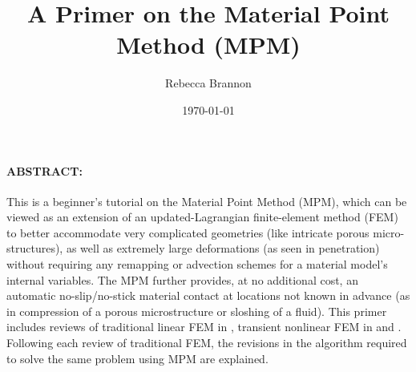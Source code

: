 
\title{A Primer on the Material Point Method (MPM)}
\author{Rebecca Brannon}
\date{\mydate\today}
\begin{minipage}[h]{\textwidth}
    \maketitle
\end{minipage}
\vspace{1cm}

\begin{MyAbstract}
\paragraph{ABSTRACT:}
This \manuscript is a beginner's tutorial on the Material Point Method (MPM), which can be viewed as an extension of an updated-Lagrangian finite-element method (FEM) to better accommodate very complicated geometries (like intricate porous micro-structures), as well as extremely large deformations (as seen in penetration) without requiring any remapping or advection schemes for a material model's internal variables. The MPM further provides, at no additional cost, an automatic no-slip/no-stick material contact at locations not known in advance (as in compression of a porous microstructure or sloshing of a fluid).  This primer includes reviews of traditional linear FEM in \oneD, transient nonlinear FEM in \oneD and \twoD.  Following each review of traditional FEM, the revisions in the algorithm required to solve the same problem using MPM are explained.

\end{MyAbstract}






\begin{comment}
\begin{acknowledgements}
The need to write this primer became clear in August 2013, when Steve Schmidt, as student in the Computational Solid Mechanics (CSM) group at the University of Utah asked a well-known MPM researcher, Jim Guilkey, if there were any good books about the MPM.  Jim replied that he was not aware of any good books on this topic. After a pause, he added ``at least there aren't any bad books on MPM either.'' A few minutes later, Steve sent Jim a screenshot of a book advertised by Barnes and Nobel booksellers under the title ``The Material Point Method.''  Within minutes, we realized that the two Russian ``authors'' were known to farm Wikipedia to create ``books'' that they didn't write themselves.  Therefore, thanks go to Barnes and Nobel for their failure to filter out this sort of sleazy publishing, prompting us to try writing an MPM book!
\end{acknowledgements}
\end{comment}


